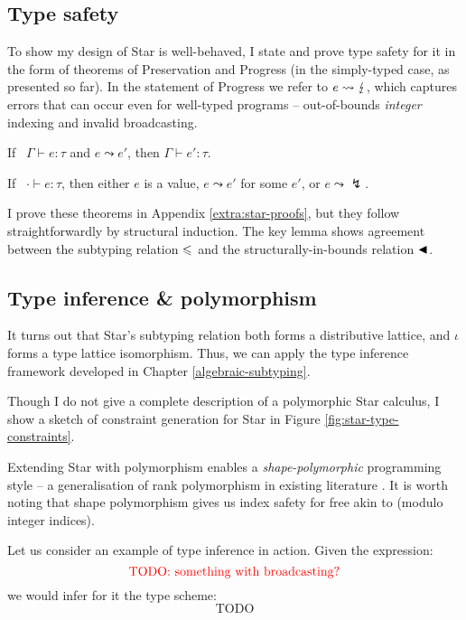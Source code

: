 \subsection{Type safety}
\label{subsec:type-safety}

To show my design of Star is well-behaved, I state and prove type safety for it in the form of theorems of Preservation and Progress (in the simply-typed case, as presented so far). In the statement of Progress we refer to $e \leadsto \lightning$, which captures errors that can occur even for well-typed programs -- out-of-bounds \emph{integer} indexing and invalid broadcasting.

\begin{theorem}[Preservation]
    If \ $\Gamma \vdash e : \tau$ and $e \leadsto e'$, then $\Gamma \vdash e' : \tau$.
\end{theorem}
\begin{theorem}[Progress]
    If \ $\cdot \vdash e : \tau$, then either $e$ is a value, $e \leadsto e'$ for some $e'$, or $e \leadsto \lightning$.
\end{theorem}

I prove these theorems in Appendix \ref{extra:star-proofs}, but they follow straightforwardly by structural induction. The key lemma shows agreement between the subtyping relation $\leqslant$ and the structurally-in-bounds relation $\blacktriangleleft$.


\subsection{Type inference \& polymorphism}
\label{subsec:type-inference}

It turns out that Star's subtyping relation both forms a distributive lattice, and $\iota$ forms a type lattice isomorphism.
Thus, we can apply the type inference framework developed in Chapter \ref{algebraic-subtyping}. 

Though I do not give a complete description of a polymorphic Star calculus, I show a sketch of constraint generation for Star in Figure \ref{fig:star-type-constraints}.

Extending Star with polymorphism enables a \emph{shape-polymorphic} programming style -- a generalisation of rank polymorphism in existing literature \cite{automap, sac-tensor-comprehensions}. 
It is worth noting that shape polymorphism gives us index safety for free akin to \textcite{theorems-for-free} (modulo integer indices).

Let us consider an example of type inference in action. Given the expression:
$$ \color{red} \text{TODO: something with broadcasting?} $$
we would infer for it the type scheme:
$$ \text{TODO} $$

